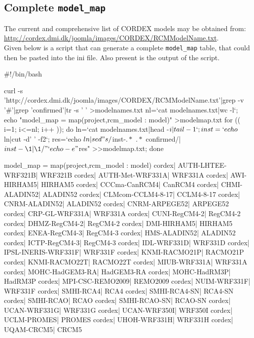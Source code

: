 \subsection{Complete \texttt{model\_map}}
The current and comprehensive list of CORDEX models may be obtained from:\\
\url{http://cordex.dmi.dk/joomla/images/CORDEX/RCMModelName.txt}. \\
Given below is a script that can generate a complete \texttt{model\_map} table, that could then be pasted into the ini file. Also present is the output of the script.
\begin{tiny}
\begin{verbatimtab}[4]
#!/bin/bash

curl -s 'http://cordex.dmi.dk/joomla/images/CORDEX/RCMModelName.txt'|grep -v '#'|grep 'confirmed'|tr -s ' ' >modelnames.txt
nl=`cat modelnames.txt|wc -l`;
echo "model_map = map(project,rcm_model : model)" >modelmap.txt
for (( i=1; i<=nl; i++ )); do
        ln=`cat modelnames.txt|head -$i|tail -1`;
        inst=`echo $ln|cut -d' ' -f2`;
        res=`echo $ln| sed "s/$inst-\(.*\) \(.*\) confirmed/\tcordex| $inst-\1| \1/"`
        echo -e "$res" >>modelmap.txt;
done

model_map = map(project,rcm_model : model)
        cordex| AUTH-LHTEE-WRF321B| WRF321B
        cordex| AUTH-Met-WRF331A| WRF331A
        cordex| AWI-HIRHAM5| HIRHAM5
        cordex| CCCma-CanRCM4| CanRCM4
        cordex| CHMI-ALADIN52| ALADIN52
        cordex| CLMcom-CCLM4-8-17| CCLM4-8-17
        cordex| CNRM-ALADIN52| ALADIN52
        cordex| CNRM-ARPEGE52| ARPEGE52
        cordex| CRP-GL-WRF331A| WRF331A
        cordex| CUNI-RegCM4-2| RegCM4-2
        cordex| DHMZ-RegCM4-2| RegCM4-2
        cordex| DMI-HIRHAM5| HIRHAM5
        cordex| ENEA-RegCM4-3| RegCM4-3
        cordex| HMS-ALADIN52| ALADIN52
        cordex| ICTP-RegCM4-3| RegCM4-3
        cordex| IDL-WRF331D| WRF331D
        cordex| IPSL-INERIS-WRF331F| WRF331F
        cordex| KNMI-RACMO21P| RACMO21P
        cordex| KNMI-RACMO22T| RACMO22T
        cordex| MIUB-WRF331A| WRF331A
        cordex| MOHC-HadGEM3-RA| HadGEM3-RA
        cordex| MOHC-HadRM3P| HadRM3P
        cordex| MPI-CSC-REMO2009| REMO2009
        cordex| NUIM-WRF331F| WRF331F
        cordex| SMHI-RCA4| RCA4
        cordex| SMHI-RCA4-SN| RCA4-SN
        cordex| SMHI-RCAO| RCAO
        cordex| SMHI-RCAO-SN| RCAO-SN
        cordex| UCAN-WRF331G| WRF331G
        cordex| UCAN-WRF350I| WRF350I
        cordex| UCLM-PROMES| PROMES
        cordex| UHOH-WRF331H| WRF331H
        cordex| UQAM-CRCM5| CRCM5
\end{verbatimtab}
\end{tiny}

